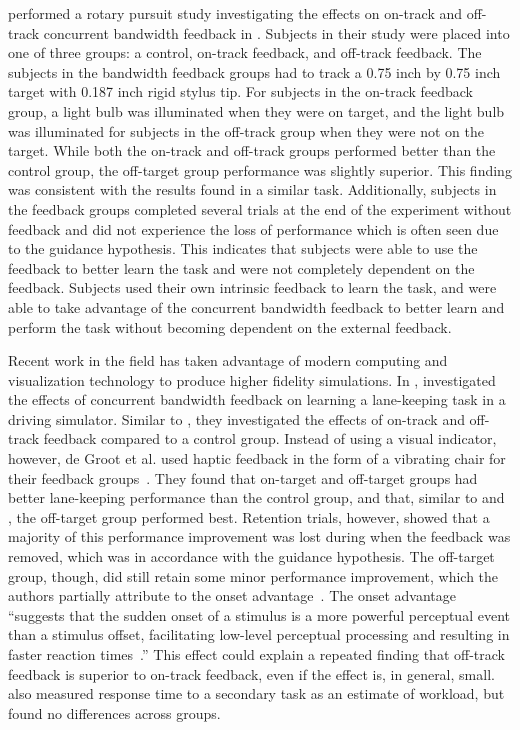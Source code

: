 \citeauthor{gordon_effect_1967} performed a rotary pursuit study investigating the effects on on-track and off-track concurrent bandwidth feedback in \citeyear{gordon_effect_1967}.
Subjects in their study were placed into one of three groups: a control, on-track feedback, and off-track feedback.
The subjects in the bandwidth feedback groups had to track a 0.75 inch by 0.75 inch target with 0.187 inch rigid stylus tip.
For subjects in the on-track feedback group, a light bulb was illuminated when they were on target, and the light bulb was illuminated for subjects in the off-track group when they were not on the target.
While both the on-track and off-track groups performed better than the control group, the off-target group performance was slightly superior.
This finding was consistent with the results \citeauthor{williams_-target_1962} found in a similar task.
Additionally, subjects in the feedback groups completed several trials at the end of the experiment without feedback and did not experience the loss of performance which is often seen due to the guidance hypothesis.
This indicates that subjects were able to use the feedback to better learn the task and were not completely dependent on the feedback.
Subjects used their own intrinsic feedback to learn the task, and were able to take advantage of the concurrent bandwidth feedback to better learn and perform the task without becoming dependent on the external feedback.

Recent work in the field has taken advantage of modern computing and visualization technology to produce higher fidelity simulations.
In \citeyear{de_groot_effect_2011}, \citeauthor{de_groot_effect_2011} investigated the effects of concurrent bandwidth feedback on learning a lane-keeping task in a driving simulator.
Similar to \citeauthor{gordon_effect_1967}, they investigated the effects of on-track and off-track feedback compared to a control group.
Instead of using a visual indicator, however, de Groot et al. used haptic feedback in the form of a vibrating chair for their feedback groups~\citep{de_groot_effect_2011}.
They found that on-target and off-target groups had better lane-keeping performance than the control group, and that, similar to \citeauthor{gordon_effect_1967} and \citeauthor{williams_-target_1962}, the off-target group performed best.
Retention trials, however, showed that a majority of this performance improvement was lost during when the feedback was removed, which was in accordance with the guidance hypothesis.
The off-target group, though, did still retain some minor performance improvement, which the authors partially attribute to the onset advantage~\citep{fischer_differential_2008}.
The onset advantage ``suggests that the sudden onset of a stimulus is a more powerful perceptual event than a stimulus offset, facilitating low-level perceptual processing and resulting in faster reaction times~\citep{de_groot_effect_2011}.''
This effect could explain a repeated finding that off-track feedback is superior to on-track feedback, even if the effect is, in general, small.
\citeauthor{de_groot_effect_2011} also measured response time to a secondary task as an estimate of workload, but found no differences across groups.

